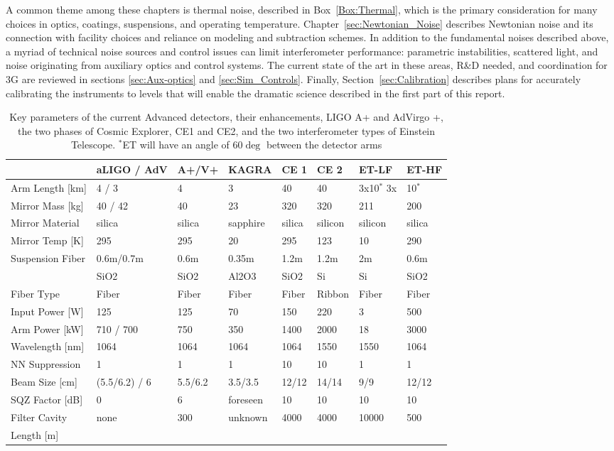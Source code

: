 A common theme among these chapters is thermal noise, described in Box~\ref{Box:Thermal}, which is the primary consideration for many choices in optics, coatings, suspensions, and operating temperature. 
Chapter~\ref{sec:Newtonian_Noise} describes Newtonian noise and its connection with facility choices and reliance on modeling and subtraction schemes. 
In addition to the fundamental noises described above, a myriad of technical noise sources and control issues can limit interferometer performance: parametric instabilities, scattered light, and noise originating from auxiliary optics and control systems. 
The current state of the art in these areas, R\&D needed, and coordination for 3G are reviewed in sections \ref{sec:Aux-optics} and \ref{sec:Sim_Controls}. 
Finally, Section~\ref{sec:Calibration} describes plans for accurately calibrating the instruments to levels that will enable the dramatic science described in the first part of this report. 

\begin{table}[h]
\centering
\begin{tabular}{|l|l|l|p{1.6cm}|l|l|l|l|}
\hline
 &aLIGO / AdV &A+/V+ &KAGRA &CE 1 &CE 2 &ET-LF &ET-HF\\
\hline
Arm Length [km] & 4 / 3 &4& 3& 40& 40& 3x10$^*$ 3x&10$^*$\\
\hline
Mirror Mass [kg]& 40 / 42& 40& 23& 320& 320& 211& 200\\
\hline
Mirror Material& silica& silica& sapphire& silica& silicon& silicon& silica\\
\hline
Mirror Temp [K]& 295& 295& 20& 295& 123& 10& 290\\
\hline
Suspension Fiber& 0.6m/0.7m& 0.6m& 0.35m& 1.2m& 1.2m& 2m& 0.6m\\
& SiO2& SiO2&Al2O3&SiO2&Si&Si&SiO2\\
\hline
Fiber Type& Fiber& Fiber& Fiber& Fiber& Ribbon& Fiber& Fiber\\
\hline
Input Power [W]& 125& 125& 70& 150& 220& 3& 500\\
\hline
Arm Power [kW]& 710 / 700& 750& 350& 1400& 2000& 18& 3000\\
\hline
Wavelength [nm]& 1064& 1064& 1064& 1064& 1550& 1550& 1064\\
\hline
NN Suppression& 1& 1& 1& 10& 10& 1& 1\\
\hline
Beam Size [cm]& (5.5/6.2) / 6& 5.5/6.2& 3.5/3.5& 12/12& 14/14& 9/9& 12/12\\
\hline
SQZ Factor [dB]& 0& 6& foreseen& 10& 10& 10& 10\\
\hline
Filter Cavity & none& 300& unknown& 4000& 4000& 10000& 500\\
Length [m] &&&&&&&\\
\hline
\end{tabular}
\caption{Key parameters of the current Advanced detectors, their enhancements, LIGO A+ and AdVirgo +, the two phases of Cosmic Explorer, CE1 and CE2, and the two interferometer types of Einstein Telescope. $^*$ET will have an angle of 60$\deg$ between the detector arms}
\label{Tab:FutIfos}
\end{table}

